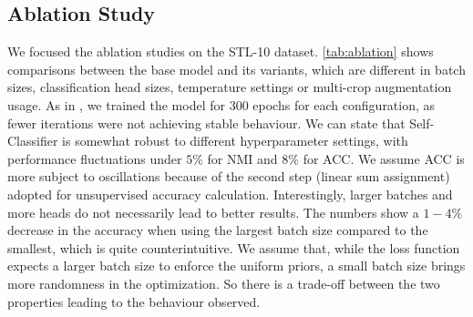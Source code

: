 \documentclass{article}
\begin{document}
\subsection{Ablation Study}
We focused the ablation studies on the STL-10 \cite{stl_10} dataset. \autoref{tab:ablation} shows comparisons between the base model and its variants, which are different in batch sizes, classification head sizes, temperature settings or multi-crop augmentation usage. As in \cite{byol}, we trained the model for 300 epochs for each configuration, as fewer iterations were not achieving stable behaviour. We can state that Self-Classifier is somewhat robust to different hyperparameter settings, with performance fluctuations under $5\%$ for NMI and $8\%$ for ACC. We assume ACC is more subject to oscillations because of the second step (linear sum assignment) adopted for unsupervised accuracy calculation. Interestingly, larger batches and more heads do not necessarily lead to better results. The numbers show a $1-4\%$ decrease in the accuracy when using the largest batch size compared to the smallest, which is quite counterintuitive. We assume that, while the loss function expects a larger batch size to enforce the uniform priors, a small batch size brings more randomness in the optimization. So there is a trade-off between the two properties leading to the behaviour observed.
\end{document}
